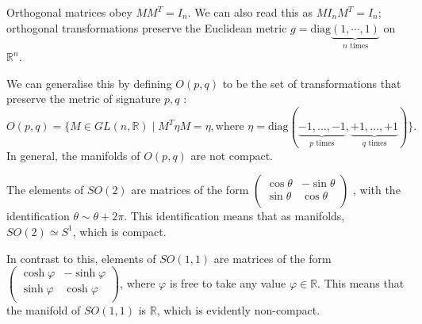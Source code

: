 Orthogonal matrices obey $M M^T = I_n$. We can also read this as $M I_n M^T = I_n$; orthogonal transformations preserve the Euclidean metric $g = \text{diag}\underbrace{(1, \cdots, 1)}_{n \text{ times}}$ on $\mathbb{R}^n$.

We can generalise this by defining $O(p, q)$ to be the set of transformations that preserve the metric of signature $p, q$ :
\begin{equation}
  O(p, q) = \big\{ M \in GL(n, \mathbb{R}) \mid M^T \eta M = \eta, \text{where } \eta = \text{diag}(\underbrace{-1, \ldots, -1}_{p \text{ times}}, \underbrace{+1, \ldots, +1}_{q \text{ times}}) \big\}.
\end{equation}
In general, the manifolds of $O(p, q)$ are not compact.

\begin{example}[]
  The elements of $SO(2)$ are matrices of the form
  $ \begin{pmatrix}
   \cos\theta & -\sin\theta \\
   \sin\theta & \cos\theta \\
  \end{pmatrix} $
  , with the identification $\theta \sim \theta + 2\pi$. This identification means that as manifolds, $SO(2) \simeq S^1$, which is compact.

  In contrast to this, elements of $SO(1, 1)$ are matrices of the form
  $ \begin{pmatrix}
   \cosh\varphi & -\sinh\varphi \\
   \sinh\varphi & \cosh\varphi \\
  \end{pmatrix}
  $, where $\varphi$ is free to take any value $\varphi \in \mathbb{R}$. This means that the manifold of $SO(1, 1)$ is $\mathbb{R}$, which is evidently non-compact.
\end{example}

